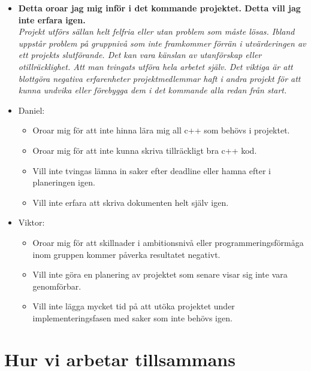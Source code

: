 \documentclass{mall}
\begin{document}
\begin{itemize}
\item \textbf{Detta oroar jag mig inför i det kommande projektet. Detta vill jag inte erfara igen.}
  \\\emph{ Projekt utförs sällan helt felfria eller utan problem som måste lösas. Ibland uppstår problem på gruppnivå som inte framkommer förrän i utvärderingen av ett projekts slutförande. Det kan vara känslan av utanförskap eller otillräcklighet. Att man tvingats utföra hela arbetet själv. Det viktiga är att blottgöra negativa erfarenheter projektmedlemmar haft i andra projekt för att kunna undvika eller förebygga dem i det kommande alla redan från start. }

\item Daniel:
  \begin{itemize}
  \item Oroar mig för att inte hinna lära mig all c++ som behövs i projektet.
  \item Oroar mig för att inte kunna skriva tillräckligt bra c++ kod.
  \item Vill inte tvingas lämna in saker efter deadline eller hamna efter i planeringen igen.
  \item Vill inte erfara att skriva dokumenten helt själv igen.
  \end{itemize}


  \item Viktor:
  \begin{itemize}
  \item Oroar mig för att skillnader i ambitionsnivå eller programmeringsförmåga inom gruppen kommer påverka resultatet negativt.
  \item Vill inte göra en planering av projektet som senare visar sig inte vara genomförbar.
  \item Vill inte lägga mycket tid på att utöka projektet under implementeringsfasen med saker som inte behövs igen.
  \end{itemize}
  
\end{itemize}

\section{Hur vi arbetar tillsammans}
\end{document}
